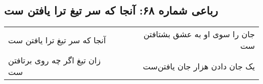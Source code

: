 \begin{center}
\section*{رباعی شماره ۶۸: آنجا که سر تیغ ترا یافتن ست}
\label{sec:sh068}
\begin{longtable}{l p{0.5cm} r}
آنجا که سر تیغ ترا یافتن ست
&&
جان را سوی او به عشق بشتافتن ست
\\
زان تیغ اگر چه روی برتافتن ست
&&
یک جان دادن هزار جان یافتن‌ست
\\
\end{longtable}
\end{center}

